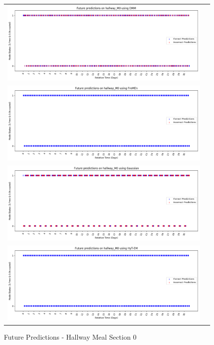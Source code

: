 \begin{figure}[!Hp]
  \begin{tabular}{cc}
    {\includegraphics[width = 6in]{images/results/Future_hallway_M0_DMM.png}} \\
    {\includegraphics[width = 6in]{images/results/Future_hallway_M0_FreMEn.png}} \\
    {\includegraphics[width = 6in]{images/results/Future_hallway_M0_Gaussian.png}} \\
    {\includegraphics[width = 6in]{images/results/Future_hallway_M0_HyT-EM.png}} \\
  \end{tabular}
  \caption{Future Predictions - Hallway Meal Section 0}
\end{figure}

